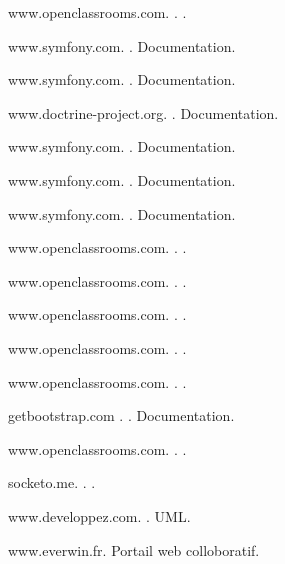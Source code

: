 \documentclass[12pt]{article}
\begin{document}
\begin{thebibliography}{10}
    
  \beamertemplatebookbibitems

   www.openclassrooms.com.
    .
    \newblock .
 
   www.symfony.com.
    .
    \newblock Documentation.
    
    www.symfony.com.
    .
    \newblock Documentation.
    
   www.doctrine-project.org.
    .
    \newblock Documentation.

   www.symfony.com.
    .
    \newblock Documentation.
    
    
    
    
    www.symfony.com.
    .
    \newblock Documentation.
    
    www.symfony.com.
    .
    \newblock Documentation.
    
   www.openclassrooms.com.
    .
    \newblock .
    
   www.openclassrooms.com.
    .
    \newblock .
    
   www.openclassrooms.com.
    .
    \newblock .

   www.openclassrooms.com.
    .
    \newblock .

   www.openclassrooms.com.
    .
    \newblock .
    
    getbootstrap.com .
    .
    \newblock Documentation.
    
    www.openclassrooms.com.
    .
    \newblock .
    
     
      socketo.me.
    .
    \newblock .
    
     
    www.developpez.com.
    .
    \newblock UML.
    
    
    
    
    
  \beamertemplatearticlebibitems

    www.everwin.fr.
    \newblock Portail web colloboratif.
    \newblock {\em }
   
  \end{thebibliography}
\end{document}
